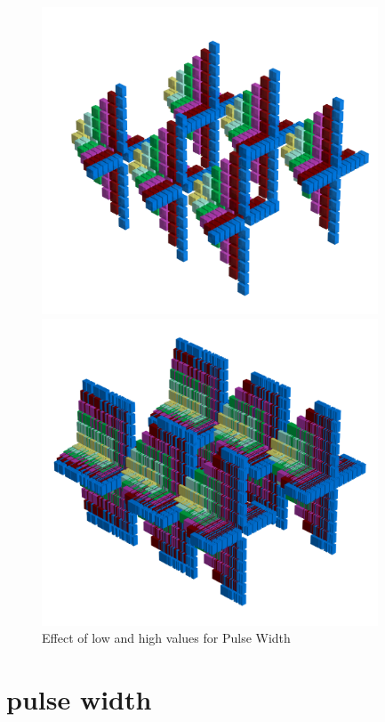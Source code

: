 \begin{figure}[H]
    \centering
    \begin{adjustbox}{width=10.5cm,center}
      \includegraphics[width=10cm]{src/pulsewidth/pattern0-45.png}%
    \end{adjustbox}
    \begin{adjustbox}{width=10.5cm,margin=0cm -2cm}
      \includegraphics[width=10cm]{src/pulsewidth/pattern1-45.png}%
    \end{adjustbox}
    \caption{Effect of low and high values for Pulse Width}
\end{figure}
\clearpage
\section*{pulse width} 
\label{sec:pulse_width}
\lstset{style=6502Style}
\lstset{ 
   aboveskip=5pt,
   belowskip=0pt,
}


